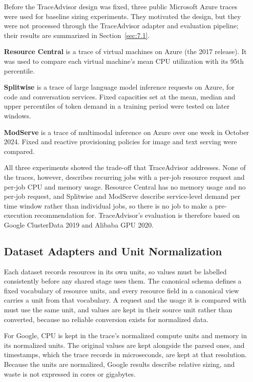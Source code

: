 Before the TraceAdvisor design was fixed, three public Microsoft Azure traces were used for baseline sizing experiments. They motivated the design, but they were not processed through the TraceAdvisor adapter and evaluation pipeline; their results are summarized in Section~\ref{sec:7.1}.

\textbf{Resource Central} is a trace of virtual machines on Azure (the 2017 release). It was used to compare each virtual machine's mean CPU utilization with its 95th percentile.

\textbf{Splitwise} is a trace of large language model inference requests on Azure, for code and conversation services. Fixed capacities set at the mean, median and upper percentiles of token demand in a training period were tested on later windows.

\textbf{ModServe} is a trace of multimodal inference on Azure over one week in October 2024. Fixed and reactive provisioning policies for image and text serving were compared.

All three experiments showed the trade-off that TraceAdvisor addresses. None of the traces, however, describes recurring jobs with a per-job resource request and per-job CPU and memory usage. Resource Central has no memory usage and no per-job request, and Splitwise and ModServe describe service-level demand per time window rather than individual jobs, so there is no job to make a pre-execution recommendation for. TraceAdvisor's evaluation is therefore based on Google ClusterData 2019 and Alibaba GPU 2020.

\subsection{Dataset Adapters and Unit Normalization}\label{sec:3.4}

Each dataset records resources in its own units, so values must be labelled consistently before any shared stage uses them. The canonical schema defines a fixed vocabulary of resource units, and every resource field in a canonical view carries a unit from that vocabulary. A request and the usage it is compared with must use the same unit, and values are kept in their source unit rather than converted, because no reliable conversion exists for normalized data.

For Google, CPU is kept in the trace's normalized compute units and memory in its normalized units. The original values are kept alongside the parsed ones, and timestamps, which the trace records in microseconds, are kept at that resolution. Because the units are normalized, Google results describe relative sizing, and waste is not expressed in cores or gigabytes.

